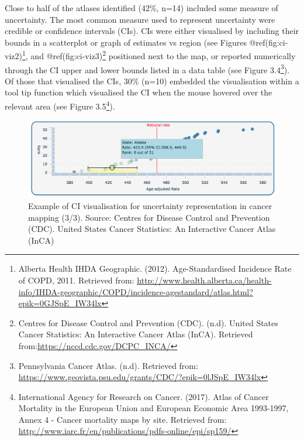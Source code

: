 \documentclass[11pt,]{article}
\let\rmarkdownfootnote\footnote%
\def\footnote{\protect\rmarkdownfootnote}
\begin{document}
Close to half of the atlases identified (42\%, n=14) included some
measure of uncertainty. The most common measure used to represent
uncertainty were credible or confidence intervals (CIs). CIs were either
visualised by including their bounds in a scatterplot or graph of
estimates vs region (see Figures @ref(fig:ci-viz2)\footnote{Alberta
  Health IHDA Geographic. (2012). Age-Standardised Incidence Rate of
  COPD, 2011. Retrieved from:
  \url{http://www.health.alberta.ca/health-info/IHDA-geographic/COPD/incidence-agestandard/atlas.html?epik=0GJSpE_IW34lx}},
and @ref(fig:ci-viz3)\footnote{Centres for Disease Control and
  Prevention (CDC). (n.d). United States Cancer Statistics: An
  Interactive Cancer Atlas (InCA). Retrieved
  from:\url{https://nccd.cdc.gov/DCPC_INCA/}} positioned next to the
map, or reported numerically through the CI upper and lower bounds
listed in a data table (see Figure 3.4\footnote{Pennsylvania Cancer
  Atlas. (n.d). Retrieved from:
  \url{https://www.geovista.psu.edu/grants/CDC/?epik=0lJSpE_IW34lx}}).
Of those that visualised the CIs, 30\% (n=10) embedded the visualisation
within a tool tip function which visualised the CI when the mouse
hovered over the relevant area (see Figure 3.5\footnote{International
  Agency for Research on Cancer. (2017). Atlas of Cancer Mortality in
  the European Union and European Economic Area 1993-1997, Annex 4 -
  Cancer mortality maps by site. Retrieved from:
  \url{http://www.iarc.fr/en/publications/pdfs-online/epi/sp159/}}).

\begin{figure}

{\centering \includegraphics[width=0.6\linewidth]{figures/CDC_CI_viz_tooltip} 

}

\caption{Example of CI visualisation for uncertainty representation in cancer mapping (3/3). Source: Centres for Disease Control and Prevention (CDC). United States Cancer Statistics: An Interactive Cancer Atlas (InCA) }\label{fig:ci-tooltip}
\end{figure}
\end{document}
